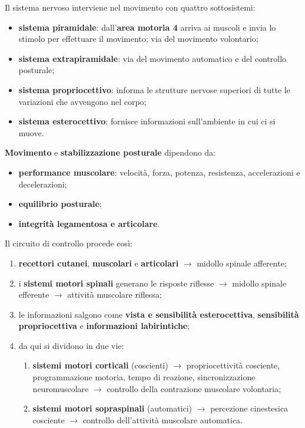 Il sistema nervoso interviene nel movimento con quattro sottosistemi:
\begin{itemize}
  \item \textbf{sistema piramidale}: dall'\textbf{area motoria 4} arriva ai muscoli e invia lo
    stimolo per effettuare il movimento; via del movimento volontario;
  \item \textbf{sistema extrapiramidale}: via del movimento automatico e del controllo
    posturale;
  \item \textbf{sistema propriocettivo}: informa le strutture nervose superiori di tutte le
    variazioni che avvengono nel corpo;
  \item \textbf{sistema esterocettivo}: fornisce informazioni sull'ambiente in cui ci si muove.
\end{itemize}

\textbf{Movimento} e \textbf{stabilizzazione posturale} dipendono da:
\begin{itemize}
  \item \textbf{performance muscolare}: velocità, forza, potenza, resistenza, accelerazioni e
    decelerazioni;
  \item \textbf{equilibrio posturale};
  \item \textbf{integrità legamentosa e articolare}.
\end{itemize}

Il circuito di controllo procede così:
\begin{enumerate}
  \item \textbf{recettori cutanei}, \textbf{muscolari} e \textbf{articolari} $\rightarrow$
    midollo spinale afferente;
  \item i \textbf{sistemi motori spinali} generano le risposte riflesse $\rightarrow$ midollo
    spinale efferente $\rightarrow$ attività muscolare riflessa;
  \item le informazioni salgono come \textbf{vista e sensibilità esterocettiva},
    \textbf{sensibilità propriocettiva} e \textbf{informazioni labirintiche};
  \item da qui si dividono in due vie:
    \begin{enumerate}
      \item \textbf{sistemi motori corticali} (coscienti) $\rightarrow$ propriocettività
        cosciente, programmazione motoria, tempo di reazione, sincronizzazione neuromuscolare
        $\rightarrow$ controllo della contrazione muscolare volontaria;
      \item \textbf{sistemi motori sopraspinali} (automatici) $\rightarrow$ percezione
        cinestesica cosciente $\rightarrow$ controllo dell'attività muscolare automatica.
    \end{enumerate}
\end{enumerate}

